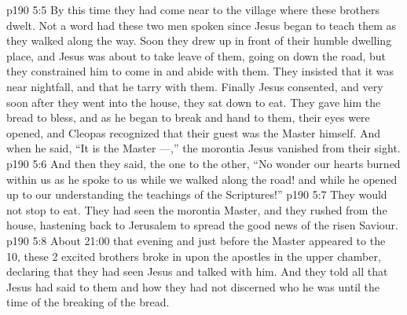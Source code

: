 \vs p190 5:5 By this time they had come near to the village where these brothers dwelt. Not a word had these two men spoken since Jesus began to teach them as they walked along the way. Soon they drew up in front of their humble dwelling place, and Jesus was about to take leave of them, going on down the road, but they constrained him to come in and abide with them. They insisted that it was near nightfall, and that he tarry with them. Finally Jesus consented, and very soon after they went into the house, they sat down to eat. They gave him the bread to bless, and as he began to break and hand to them, their eyes were opened, and Cleopas recognized that their guest was the Master himself. And when he said, “It is the Master ---,” the morontia Jesus vanished from their sight.
\vs p190 5:6 And then they said, the one to the other, “No wonder our hearts burned within us as he spoke to us while we walked along the road! and while he opened up to our understanding the teachings of the Scriptures!”
\vs p190 5:7 They would not stop to eat. They had seen the morontia Master, and they rushed from the house, hastening back to Jerusalem to spread the good news of the risen Saviour.
\vs p190 5:8 About 21:00 that evening and just before the Master appeared to the 10, these 2 excited brothers broke in upon the apostles in the upper chamber, declaring that they had seen Jesus and talked with him. And they told all that Jesus had said to them and how they had not discerned who he was until the time of the breaking of the bread.

